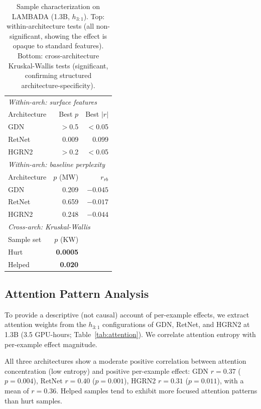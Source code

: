 \documentclass[11pt]{article}
\begin{document}
\begin{table}[t]
\centering
\caption{Sample characterization on LAMBADA (1.3B, $h_{3:1}$). Top: within-architecture tests (all non-significant, showing the effect is opaque to standard features). Bottom: cross-architecture Kruskal-Wallis tests (significant, confirming structured architecture-specificity).}
\label{tab:characterization}
\small
\begin{tabular}{lrr}
\toprule
\multicolumn{3}{l}{\textit{Within-arch: surface features}} \\
Architecture & Best $p$ & Best $|r|$ \\
\midrule
GDN & $>$0.5 & $<$0.05 \\
RetNet & 0.009 & 0.099 \\
HGRN2 & $>$0.2 & $<$0.05 \\
\midrule
\multicolumn{3}{l}{\textit{Within-arch: baseline perplexity}} \\
Architecture & $p$ (MW) & $r_{rb}$ \\
\midrule
GDN & 0.209 & ${-}0.045$ \\
RetNet & 0.659 & ${-}0.017$ \\
HGRN2 & 0.248 & ${-}0.044$ \\
\midrule
\multicolumn{3}{l}{\textit{Cross-arch: Kruskal-Wallis}} \\
Sample set & $p$ (KW) & \\
\midrule
Hurt & \textbf{0.0005} & \\
Helped & \textbf{0.020} & \\
\bottomrule
\end{tabular}
\end{table}

\subsection{Attention Pattern Analysis}
\label{sec:attention}

To provide a descriptive (not causal) account of per-example effects, we extract attention weights from the $h_{3:1}$ configurations of GDN, RetNet, and HGRN2 at 1.3B (3.5 GPU-hours; Table~\ref{tab:attention}).
We correlate attention entropy with per-example effect magnitude.

All three architectures show a moderate positive correlation between attention concentration (low entropy) and positive per-example effect: GDN $r = 0.37$ ($p = 0.004$), RetNet $r = 0.40$ ($p = 0.001$), HGRN2 $r = 0.31$ ($p = 0.011$), with a mean of $r = 0.36$.
Helped samples tend to exhibit more focused attention patterns than hurt samples.
\end{document}
